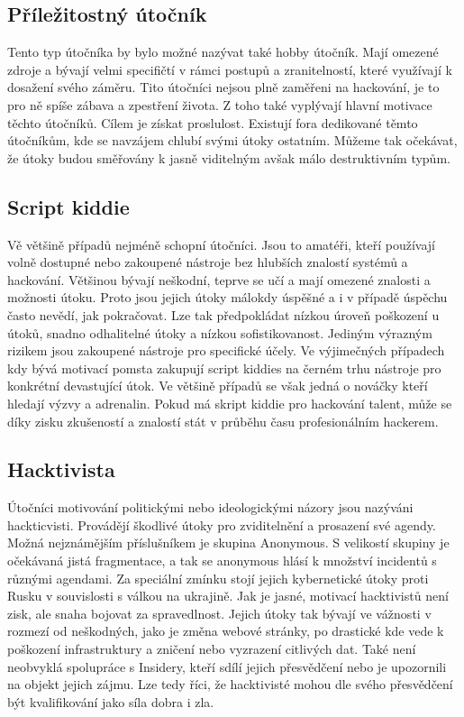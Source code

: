 \subsection{Příležitostný útočník}
Tento typ útočníka by bylo možné nazývat také hobby útočník.
Mají omezené zdroje a bývají velmi specifičtí v rámci postupů a zranitelností, které využívají k dosažení svého záměru.
Tito útočníci nejsou plně zaměřeni na hackování, je to pro ně spíše zábava a zpestření života.
Z toho také vyplývají hlavní motivace těchto útočníků.
Cílem je získat proslulost.
Existují fora dedikované těmto útočníkům, kde se navzájem chlubí svými útoky ostatním.
Můžeme tak očekávat, že útoky budou směřovány k jasně viditelným avšak málo destruktivním typům.

\subsection{Script kiddie}
Vě většině případů nejméně schopní útočníci.
Jsou to amatéři, kteří používají volně dostupné nebo zakoupené nástroje bez hlubších znalostí systémů a hackování.
Většinou bývají neškodní, teprve se učí a mají omezené znalosti a možnosti útoku.
Proto jsou jejich útoky málokdy úspěšné a i v případě úspěchu často nevědí, jak pokračovat.
Lze tak předpokládat nízkou úroveň poškození u útoků, snadno odhalitelné útoky a nízkou sofistikovanost.
Jediným výrazným rizikem jsou zakoupené nástroje pro specifické účely.
Ve výjimečných případech kdy bývá motivací pomsta zakupují script kiddies na černém trhu nástroje pro konkrétní devastující útok.
Ve většině případů se však jedná o nováčky kteří hledají výzvy a adrenalin.
Pokud má skript kiddie pro hackování talent, může se díky zisku zkušeností a znalostí stát v průběhu času profesionálním hackerem.

\subsection{Hacktivista}
Útočníci motivování politickými nebo ideologickými názory jsou nazýváni hackticvisti.
Provádějí škodlivé útoky pro zviditelnění a prosazení své agendy.
Možná nejznámějším příslušníkem je skupina Anonymous.
S velikostí skupiny je očekávaná jistá fragmentace, a tak se anonymous hlásí k množství incidentů s různými agendami.
Za speciální zmínku stojí jejich kybernetické útoky proti Rusku v souvislosti s válkou na ukrajině\cite{anonymous_russian_attacks}.
Jak je jasné, motivací hacktivistů není zisk, ale snaha bojovat za spravedlnost.
Jejich útoky tak bývají ve vážnosti v rozmezí od neškodných, jako je změna webové stránky, po drastické kde vede k poškození infrastruktury a zničení nebo vyzrazení citlivých dat.
Také není neobvyklá spolupráce s Insidery, kteří sdílí jejich přesvědčení nebo je upozornili na objekt jejich zájmu.
Lze tedy říci, že hacktivisté mohou dle svého přesvědčení být kvalifikování jako síla dobra i zla.



